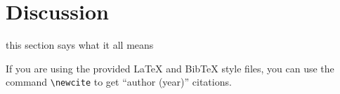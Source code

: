 \documentclass[11pt]{article}
\begin{document}
\section{Discussion}

this section says what it all means

If you are using the provided \LaTeX{} and Bib\TeX{} style files, you
can use the command \verb|\newcite| to get ``author (year)'' citations.




\end{document}
